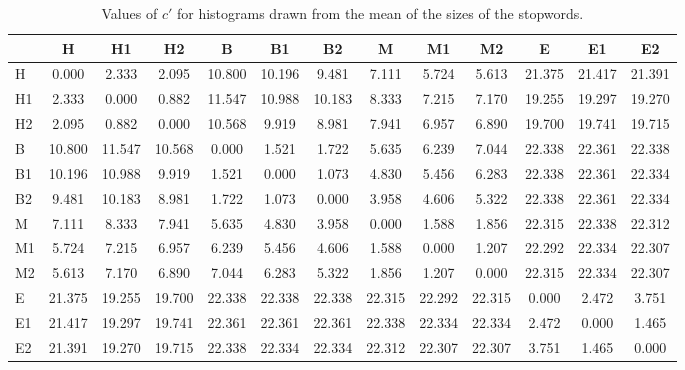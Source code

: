 \begin{table*}[h!]
\begin{center}
\begin{tabular}{| l | c | c | c | c | c | c | c | c | c | c | c | c |}\hline
 & H & H1 & H2 & B & B1 & B2 & M & M1 & M2 & E & E1 & E2 \\\hline
H & 0.000  & 2.333  & 2.095  & 10.800  & 10.196  & 9.481  & 7.111  & 5.724  & 5.613  & 21.375  & 21.417  & 21.391 \\\hline
H1 & 2.333  & 0.000  & 0.882  & 11.547  & 10.988  & 10.183  & 8.333  & 7.215  & 7.170  & 19.255  & 19.297  & 19.270 \\\hline
H2 & 2.095  & 0.882  & 0.000  & 10.568  & 9.919  & 8.981  & 7.941  & 6.957  & 6.890  & 19.700  & 19.741  & 19.715 \\\hline
B & 10.800  & 11.547  & 10.568  & 0.000  & 1.521  & 1.722  & 5.635  & 6.239  & 7.044  & 22.338  & 22.361  & 22.338 \\\hline
B1 & 10.196  & 10.988  & 9.919  & 1.521  & 0.000  & 1.073  & 4.830  & 5.456  & 6.283  & 22.338  & 22.361  & 22.334 \\\hline
B2 & 9.481  & 10.183  & 8.981  & 1.722  & 1.073  & 0.000  & 3.958  & 4.606  & 5.322  & 22.338  & 22.361  & 22.334 \\\hline
M & 7.111  & 8.333  & 7.941  & 5.635  & 4.830  & 3.958  & 0.000  & 1.588  & 1.856  & 22.315  & 22.338  & 22.312 \\\hline
M1 & 5.724  & 7.215  & 6.957  & 6.239  & 5.456  & 4.606  & 1.588  & 0.000  & 1.207  & 22.292  & 22.334  & 22.307 \\\hline
M2 & 5.613  & 7.170  & 6.890  & 7.044  & 6.283  & 5.322  & 1.856  & 1.207  & 0.000  & 22.315  & 22.334  & 22.307 \\\hline
E & 21.375  & 19.255  & 19.700  & 22.338  & 22.338  & 22.338  & 22.315  & 22.292  & 22.315  & 0.000  & 2.472  & 3.751 \\\hline
E1 & 21.417  & 19.297  & 19.741  & 22.361  & 22.361  & 22.361  & 22.338  & 22.334  & 22.334  & 2.472  & 0.000  & 1.465 \\\hline
E2 & 21.391  & 19.270  & 19.715  & 22.338  & 22.334  & 22.334  & 22.312  & 22.307  & 22.307  & 3.751  & 1.465  & 0.000 \\\hline
\end{tabular}
\caption{Values of $c'$ for histograms drawn from the mean of the sizes of the stopwords.}
\end{center}
\end{table*}